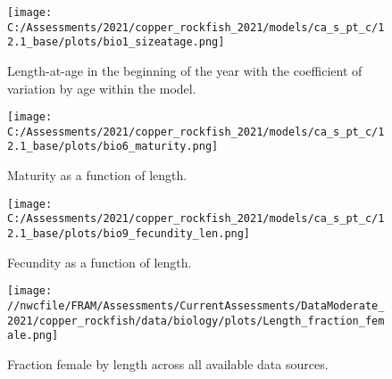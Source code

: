 \documentclass[11pt,
  english,
  a4paper,
]{article}
\begin{document}
\tagmcend\tagstructend

\clearpage


\begin{figure}
\centering
\texttt{[image: C:/Assessments/2021/copper\_rockfish\_2021/models/ca\_s\_pt\_c/12.1\_base/plots/bio1\_sizeatage.png]}
\caption{Length-at-age in the beginning of the year with the coefficient of variation by age within the model.\label{fig:len-age-ss}}
\end{figure}

\tagmcend\tagstructend


\begin{figure}
\centering
\texttt{[image: C:/Assessments/2021/copper\_rockfish\_2021/models/ca\_s\_pt\_c/12.1\_base/plots/bio6\_maturity.png]}
\caption{Maturity as a function of length.\label{fig:maturity}}
\end{figure}

\tagmcend\tagstructend


\begin{figure}
\centering
\texttt{[image: C:/Assessments/2021/copper\_rockfish\_2021/models/ca\_s\_pt\_c/12.1\_base/plots/bio9\_fecundity\_len.png]}
\caption{Fecundity as a function of length.\label{fig:fecundity}}
\end{figure}

\tagmcend\tagstructend


\begin{figure}
\centering
\texttt{[image: //nwcfile/FRAM/Assessments/CurrentAssessments/DataModerate\_2021/copper\_rockfish/data/biology/plots/Length\_fraction\_female.png]}
\caption{Fraction female by length across all available data sources.\label{fig:len-sex-ratio}}
\end{figure}

\tagmcend\tagstructend
\end{document}
